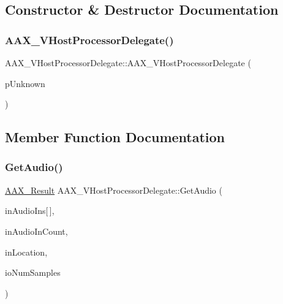 \subsection{Constructor \& Destructor Documentation}
\mbox{\label{a01921_ab50f9b08bc0d0ab6696ad3081aa790d8}} 
\subsubsection{\texorpdfstring{AAX\_VHostProcessorDelegate()}{AAX\_VHostProcessorDelegate()}}
{\footnotesize\ttfamily A\+A\+X\+\_\+\+V\+Host\+Processor\+Delegate\+::\+A\+A\+X\+\_\+\+V\+Host\+Processor\+Delegate (\begin{DoxyParamCaption}\item[{\mbox{\hyperlink{a01409}{I\+A\+C\+F\+Unknown}} $\ast$}]{p\+Unknown }\end{DoxyParamCaption})}



\subsection{Member Function Documentation}
\mbox{\label{a01921_a030e6742a3aa468a50faccb77329a557}} 
\subsubsection{\texorpdfstring{GetAudio()}{GetAudio()}}
{\footnotesize\ttfamily \mbox{\hyperlink{a00392_a4d8f69a697df7f70c3a8e9b8ee130d2f}{A\+A\+X\+\_\+\+Result}} A\+A\+X\+\_\+\+V\+Host\+Processor\+Delegate\+::\+Get\+Audio (\begin{DoxyParamCaption}\item[{const float $\ast$const}]{in\+Audio\+Ins\mbox{[}$\,$\mbox{]},  }\item[{int32\+\_\+t}]{in\+Audio\+In\+Count,  }\item[{int64\+\_\+t}]{in\+Location,  }\item[{int32\+\_\+t $\ast$}]{io\+Num\+Samples }\end{DoxyParamCaption})\hspace{0.3cm}{\ttfamily [virtual]}}



